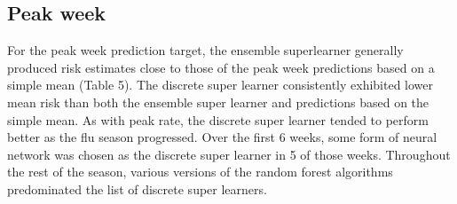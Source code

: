 \documentclass[10pt,letterpaper]{article}
\begin{document}
\hypertarget{peak-week}{%
\subsection{Peak week}\label{peak-week}}

For the peak week prediction target, the ensemble superlearner generally
produced risk estimates close to those of the peak week predictions
based on a simple mean (Table 5). The discrete super learner
consistently exhibited lower mean risk than both the ensemble super
learner and predictions based on the simple mean. As with peak rate, the
discrete super learner tended to perform better as the flu season
progressed. Over the first 6 weeks, some form of neural network was
chosen as the discrete super learner in 5 of those weeks. Throughout the
rest of the season, various versions of the random forest algorithms
predominated the list of discrete super learners.
\end{document}
